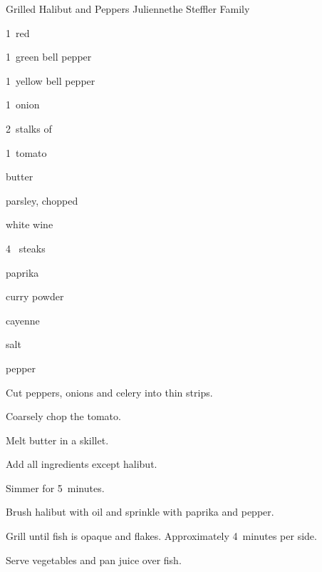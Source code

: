\begin{recipe}{Grilled Halibut and Peppers Julienne}{the Steffler Family}{}

\begin{ingredients}
\item 1~red 
\item 1~green bell pepper
\item 1~yellow bell pepper
\item 1~onion
\item 2~stalks of 
\item 1~tomato
\item {} butter
\item {} parsley, chopped
\item \C{\twothird} white wine
\item 4~ steaks
\item paprika
\item curry powder
\item cayenne
\item salt
\item pepper
\end{ingredients}

\begin{directions}
\item Cut peppers, onions and celery into thin strips.
\item Coarsely chop the tomato.
\item Melt butter in a skillet.
\item Add all ingredients except halibut.
\item Simmer for 5~minutes.
\item Brush halibut with oil and sprinkle with paprika and pepper.
\item Grill until fish is opaque and flakes. Approximately 4~minutes per side.
\item Serve vegetables and pan juice over fish.
\end{directions}
\end{recipe}
